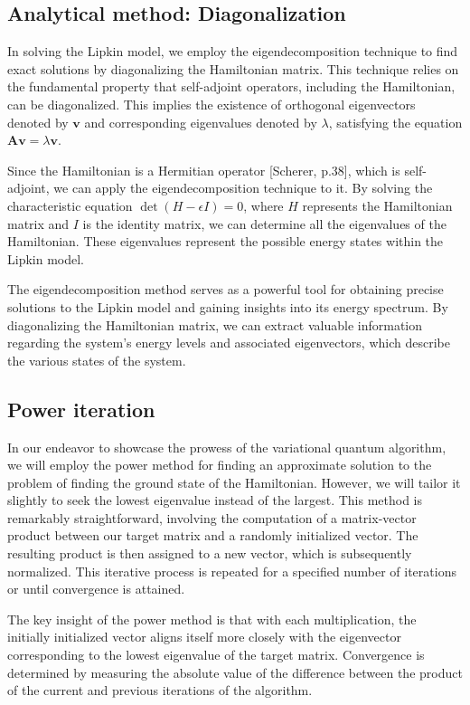 \documentclass[onecolumn,10pt,cleanfoot]{asme2ej}
\begin{document}
\subsection{Analytical method: Diagonalization}
In solving the Lipkin model, we employ the eigendecomposition technique to find exact solutions by diagonalizing the Hamiltonian matrix. This technique relies on the fundamental property that self-adjoint operators, including the Hamiltonian, can be diagonalized. This implies the existence of orthogonal eigenvectors denoted by $\mathbf{v}$ and corresponding eigenvalues denoted by $\lambda$, satisfying the equation $\mathbf{A} \mathbf{v} = \lambda \mathbf{v}$.

Since the Hamiltonian is a Hermitian operator [Scherer, p.38], which is self-adjoint, we can apply the eigendecomposition technique to it. By solving the characteristic equation $\det(H - \epsilon I) = 0$, where $H$ represents the Hamiltonian matrix and $I$ is the identity matrix, we can determine all the eigenvalues of the Hamiltonian. These eigenvalues represent the possible energy states within the Lipkin model.

The eigendecomposition method serves as a powerful tool for obtaining precise solutions to the Lipkin model and gaining insights into its energy spectrum. By diagonalizing the Hamiltonian matrix, we can extract valuable information regarding the system's energy levels and associated eigenvectors, which describe the various states of the system.


\subsection{Power iteration}
In our endeavor to showcase the prowess of the variational quantum algorithm, we will employ the power method for finding an approximate solution to the problem of finding the ground state of the Hamiltonian. However, we will tailor it slightly to seek the lowest eigenvalue instead of the largest. This method is remarkably straightforward, involving the computation of a matrix-vector product between our target matrix and a randomly initialized vector. The resulting product is then assigned to a new vector, which is subsequently normalized. This iterative process is repeated for a specified number of iterations or until convergence is attained.

The key insight of the power method is that with each multiplication, the initially initialized vector aligns itself more closely with the eigenvector corresponding to the lowest eigenvalue of the target matrix. Convergence is determined by measuring the absolute value of the difference between the product of the current and previous iterations of the algorithm.
\end{document}
